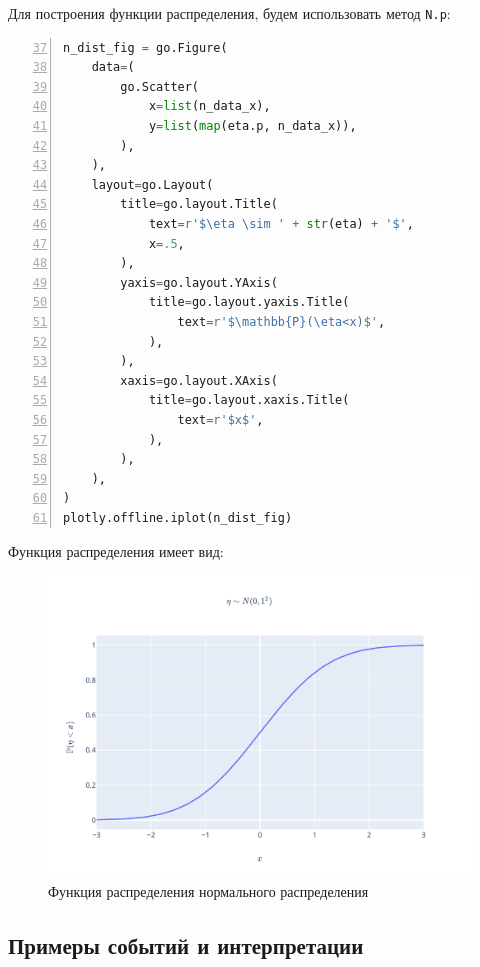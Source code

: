 \documentclass[
  russian,
  a4paper,
]{article}
\newcommand{\passthrough}[1]{#1}
\begin{document}
Для построения функции распределения, будем использовать метод
\passthrough{\lstinline!N.p!}:

\begin{lstlisting}[language=Python, numbers=left, firstnumber=37]
n_dist_fig = go.Figure(
    data=(
        go.Scatter(
            x=list(n_data_x),
            y=list(map(eta.p, n_data_x)),
        ),
    ),
    layout=go.Layout(
        title=go.layout.Title(
            text=r'$\eta \sim ' + str(eta) + '$',
            x=.5,
        ),
        yaxis=go.layout.YAxis(
            title=go.layout.yaxis.Title(
                text=r'$\mathbb{P}(\eta<x)$',
            ),
        ),
        xaxis=go.layout.XAxis(
            title=go.layout.xaxis.Title(
                text=r'$x$',
            ),
        ),
    ),
)
plotly.offline.iplot(n_dist_fig)
\end{lstlisting}

Функция распределения имеет вид:

\begin{figure}
\centering
\includegraphics{../assets/n_distribution.svg}
\caption{Функция распределения нормального распределения}
\end{figure}

\hypertarget{ux43fux440ux438ux43cux435ux440ux44b-ux441ux43eux431ux44bux442ux438ux439-ux438-ux438ux43dux442ux435ux440ux43fux440ux435ux442ux430ux446ux438ux438}{%
\subsection{Примеры событий и
интерпретации}\label{ux43fux440ux438ux43cux435ux440ux44b-ux441ux43eux431ux44bux442ux438ux439-ux438-ux438ux43dux442ux435ux440ux43fux440ux435ux442ux430ux446ux438ux438}}
\end{document}
